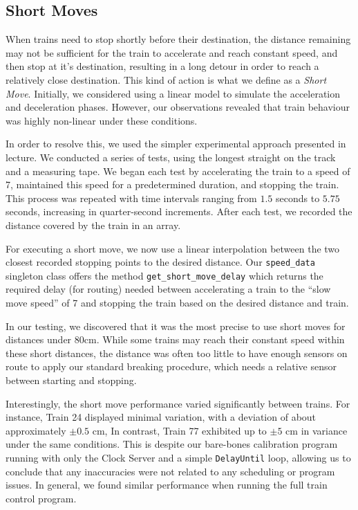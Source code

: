 \documentclass[12pt, titlepage]{article}
\begin{document}
    \subsection{Short Moves}
    \label{sec:short-moves}
    
    When trains need to stop shortly before their destination, the distance remaining may not be sufficient for the train to accelerate and reach constant speed, and then stop at it's destination, resulting in a long detour in order to reach a relatively close destination. This kind of action is what we define as a \emph{Short Move}.
    Initially, we considered using a linear model to simulate the acceleration and deceleration phases. 
    However, our observations revealed that train behaviour was highly non-linear under these conditions.

    In order to resolve this, we used the simpler experimental approach presented in lecture. 
    We conducted a series of tests, using the longest straight on the track and a measuring tape. 
    We began each test by accelerating the train to a speed of 7, maintained this speed for a predetermined duration, and stopping the train. 
    This process was repeated with time intervals ranging from $1.5$ seconds to $5.75$ seconds, increasing in quarter-second increments. 
    After each test, we recorded the distance covered by the train in an array.

    For executing a short move, we now use a linear interpolation between the two closest recorded stopping points to the desired distance. 
    Our \verb'speed_data' singleton class offers the method \verb`get_short_move_delay` which returns the required delay (for routing) needed between accelerating a train to the ``slow move speed'' of 7 and stopping the train based on the desired distance and train.
    
    In our testing, we discovered that it was the most precise to use short moves for distances under 80cm.
    While some trains may reach their constant speed within these short distances, the distance was often too little to have enough sensors on route to apply our standard breaking procedure, which needs a relative sensor between starting and stopping.

    Interestingly, the short move performance varied significantly between trains. 
    For instance, Train 24 displayed minimal variation, with a deviation of about approximately $\pm0.5$ cm, 
    In contrast, Train 77 exhibited up to $\pm5$ cm in variance under the same conditions.
    This is despite our bare-bones calibration program running with only the Clock Server and a simple \verb`DelayUntil` loop, allowing us to conclude that any inaccuracies were not related to any scheduling or program issues. 
    In general, we found similar performance when running the full train control program.
    
\end{document}
